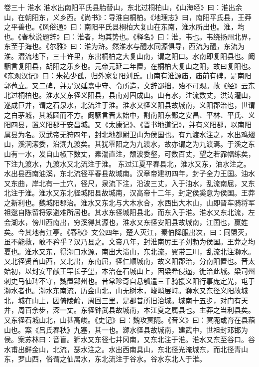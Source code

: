 \documentclass[12pt,UTF8]{ctexbook}
\begin{document}
卷三十  淮水 
淮水出南阳平氏县胎替山，东北过桐柏山，《山海经》曰：淮出余山，在朝阳东，义乡西。《尚书》：导淮自桐柏。《地理志》曰，南阳平氏县，王莽之平善也。《风俗通》曰：南阳平氏县桐柏大复山在东南，淮水所出也。淮，均也。《春秋说题辞》曰：淮者，均其势也。《释名》曰：淮，韦也。韦绕扬州北界，东至于海也。《尔雅》曰：淮为浒。然淮水与醴水同源俱导，西流为醴，东流为淮。潜流地下，三十许里，东出桐柏之大复山南，谓之阳口。水南即复阳县也。阚駰言复阳县，胡阳之乐乡也。元帝元延二年置，在桐柏大复山之阳，故曰复阳也。《东观汉记》曰：朱祐少孤，归外家复阳刘氏。山南有淮源庙，庙前有碑，是南阳郭苞立。又二碑，并是汉延熹中守、令所造，文辞鄙拙，殆不可观。故《经》云东北过桐柏也。淮水又东径义阳县，县南对固成山。山有水，注流数丈，洪涛灌山，遂成巨井，谓之石泉水，北流注于淮。淮水又径义阳县故城南，义阳郡治也，世谓之白茅城，其城圆而不方。阚駰言晋太始中，割南阳东鄙之安昌、平林、平氏、义阳四县，置义阳郡于安昌城。又《太康记》、《晋书地道记》，并有义阳郡，以南阳属县为名。汉武帝无狩四年，封北地都尉卫山为侯国也。有九渡水注之，水出鸡翅山，溪涧潆委，沿溯九渡矣。其犹零阳之为九渡水，故亦谓之为九渡焉。于溪之东山有一水，发自山椒下数丈，素湍直注，颓波委壑，可数百丈，望之若霏幅练矣，下注九渡水，九渡水又北流注于淮。
东过江夏平春县北，淮水又东，油水注之。水出县西南油溪，东北流径平春县故城南。汉章帝建初四年，封子全力王国。油水又东曲，岸北有一土穴，径尺，泉流下注，沿波三丈，入于油水，乱流南屈，又东北注于淮。淮水又东北径城阳县故城南，汉高帝十二年，封定侯奚意为侯国。王莽之新利也。魏城阳郡治。淮水又东北与大木水合，水西出大木山，山即晋车骑将军祖逖自陈留将家避难所居也。其水东径城阳县北，而东入于淮。淮水又东北流，左会湖水，傍川西南出，穷溪得其源也，淮水又东径安阳县故城南，江国也，赢姓矣。今其地有江亭。《春秋》文公四年，楚人灭江，秦伯降服出次，曰：同盟灭，虽不能救，敢不矜乎？汉乃县之。文帝八年，封淮南厉王子刘勃为侯国。王莽之均夏也。淮水又东，得溮口水源，南出大溃山，东北流，翼带三川，乱流北注溮水。又北径贤首山西，又北出，东南屈，径仁顺城南，故义阳郡治，分南阳置也。晋太始初，以封安平献王罕长子望，本治在石城山上，因梁希侵逼，徙洽此城。梁司州刺史马仙琕不守，魏置郢州也。昔常珍奇自悬瓠遣三千骑援义阳行事庞定光，屯于溮水者也。溮水东南流，历金山北，山无树木，峻峭层峙。溮水又东径义阳故城北，城在山上，因倚陵岭，周回三里，是郡昔所旧治城。城南十五步，对门有天井，周百余步，深一丈。东径钟武县故城南，本江夏之属县也。主莽之当利县矣。又东径石城山北，山甚高峻。《史记》曰：魏攻冥阨。《音义》曰：冥阨或育在县葙山也。案《吕氏春秋》九塞，其一也。溮水径县故城南，建武中，世祖封邓邯为侯。案苏林曰：音盲。狮水又东径七井冈南，又东北注于淮。淮水又东至谷口。谷水甫出鲜金山，北流，瑟水注之。水出西南具山，东北径光淹城东，而北径青山东，罗山西，俗谓之仙居水，东北流注于谷水。谷水东北人于淮。
\end{document}
